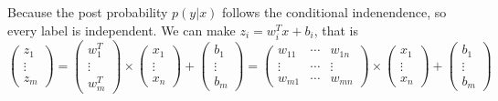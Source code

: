 

    \begin{solution}
        Because the post probability $p(y|x)$ follows the conditional indenendence, so every label is independent. We can make $z_{i}=w_{i}^{T}x+b_{i}$, that is
        \[\left(
        \begin{matrix}
            z_{1}\\
            \vdots\\
            z_{m}
        \end{matrix}
        \right)=
        \left(
        \begin{matrix}
            w_{1}^{T}\\
            \vdots\\
            w_{m}^{T}
        \end{matrix}
        \right)\times
        \left(
        \begin{matrix}
            x_{1}\\
            \vdots\\
            x_{n}
        \end{matrix}
        \right)+
        \left(
        \begin{matrix}
            b_{1}\\
            \vdots\\
            b_{m}
        \end{matrix}
        \right)=
        \left(
        \begin{matrix}
            w_{11} & \cdots & w_{1n}\\
            \vdots & \cdots & \vdots\\
            w_{m1} & \cdots & w_{mn}
        \end{matrix}
        \right)\times
        \left(
        \begin{matrix}
            x_{1}\\
            \vdots\\
            x_{n}
        \end{matrix}
        \right)+
        \left(
        \begin{matrix}
            b_{1}\\
            \vdots\\
            b_{m}
        \end{matrix}
        \right)
        \]
        \begin{enumerate}

\end{enumerate}
\end{solution}
